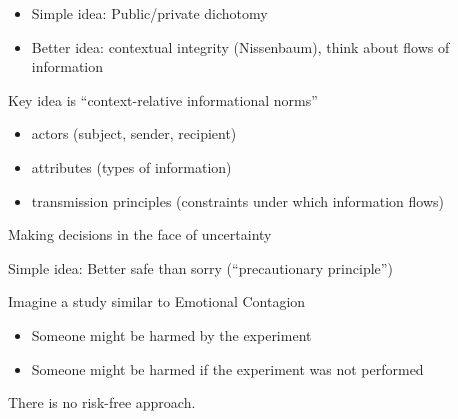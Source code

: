 \documentclass{beamer}
\def\vf{\vfill}
\begin{document}
\begin{frame}

\begin{itemize}
\item Simple idea: Public/private dichotomy
\item Better idea: contextual integrity (Nissenbaum), think about flows of information
\end{itemize}

\end{frame}
\begin{frame}

Key idea is ``context-relative informational norms''\\
\begin{itemize}
\item actors (subject, sender, recipient)
\item attributes (types of information)
\item transmission principles (constraints under which information flows)
\end{itemize}

\end{frame}
\begin{frame}

\begin{center}
\Large{Making decisions in the face of uncertainty}
\end{center}

\end{frame}
\begin{frame}

Simple idea: Better safe than sorry (``precautionary principle'')

\end{frame}
\begin{frame}

Imagine a study similar to Emotional Contagion\\
\begin{itemize}
\item Someone might be harmed by the experiment
\pause
\item Someone might be harmed if the experiment was not performed
\end{itemize}

\vf
There is no risk-free approach.

\end{frame}
\end{document}
